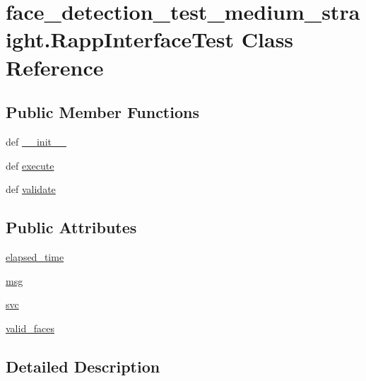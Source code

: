 \hypertarget{classface__detection__test__medium__straight_1_1RappInterfaceTest}{\section{face\-\_\-detection\-\_\-test\-\_\-medium\-\_\-straight.\-Rapp\-Interface\-Test Class Reference}
\label{classface__detection__test__medium__straight_1_1RappInterfaceTest}
}
\subsection*{Public Member Functions}
\begin{DoxyCompactItemize}
\item 
def \hyperlink{classface__detection__test__medium__straight_1_1RappInterfaceTest_a1fd50662520a1155d022ab810a361b41}{\-\_\-\-\_\-init\-\_\-\-\_\-}
\item 
def \hyperlink{classface__detection__test__medium__straight_1_1RappInterfaceTest_a0dd7ef95d869635dc9815833be53f02b}{execute}
\item 
def \hyperlink{classface__detection__test__medium__straight_1_1RappInterfaceTest_ab895aebaf53763223674a1f03e357179}{validate}
\end{DoxyCompactItemize}
\subsection*{Public Attributes}
\begin{DoxyCompactItemize}
\item 
\hyperlink{classface__detection__test__medium__straight_1_1RappInterfaceTest_a1c19028329ec17f3cde63cf17a8d02f3}{elapsed\-\_\-time}
\item 
\hyperlink{classface__detection__test__medium__straight_1_1RappInterfaceTest_abbc3d0f27d103717c1f244fa5c7bb66d}{msg}
\item 
\hyperlink{classface__detection__test__medium__straight_1_1RappInterfaceTest_a5b93ba7d43d9feaa4213014177a9f7f6}{svc}
\item 
\hyperlink{classface__detection__test__medium__straight_1_1RappInterfaceTest_a43b16f96ecb1d93c469b857dedcd0575}{valid\-\_\-faces}
\end{DoxyCompactItemize}


\subsection{Detailed Description}


